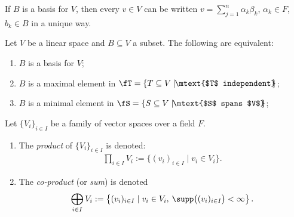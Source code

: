     \begin{corollary}
        If $B$ is a basis for $V$, then every $v \in V$ can be written $v = \sum_{j = 1}^n \alpha_k \beta_k$, $\alpha_k \in F$, $b_k \in B$ in a unique way.
    \end{corollary}

    \begin{theorem}
        Let $V$ be a linear space and $B \subseteq V$ a subset. The following are equivalent:
            \begin{enumerate}[label = (\arabic*),itemsep=1pt,topsep=3pt]
                \item $B$ is a basis for $V$;
                \item $B$ is a maximal element in $\fT = \{T \subseteq V \mid \hspace{-4pt}\mtext{$T$ independent}\hspace{-4pt}\}$;
                \item $B$ is a minimal element in $\fS = \{S \subseteq V \mid \hspace{-4pt}\mtext{$S$ spans $V$}\hspace{-4pt}\}$;
            \end{enumerate}
    \end{theorem}

    \begin{definition}
        Let $\{V_i\}_{i \in I}$ be a family of vector spaces over a field $F$.
            \begin{enumerate}[label = (\arabic*),itemsep=1pt,topsep=3pt]
                \item The \textit{product} of $\{V_i\}_{i \in I}$ is denoted:
                    \begin{equation*}
                    \begin{split}
                        \prod_{i \in I}V_i := \{(v_i)_{i \in I} \mid v_i \in V_i\}.
                    \end{split}
                    \end{equation*}
                \item The \textit{co-product} (or \textit{sum}) is denoted 
                    \begin{equation*}
                    \begin{split}
                        \bigoplus_{i \in I}V_i := \left\{(v_i)_{i \in I} \mid v_i \in V_i,\hspace{2pt} \supp\bigl((v_i)_{i \in I}\bigr) <\infty \right\}.
                    \end{split}
                    \end{equation*}
            \end{enumerate}
    \end{definition}

